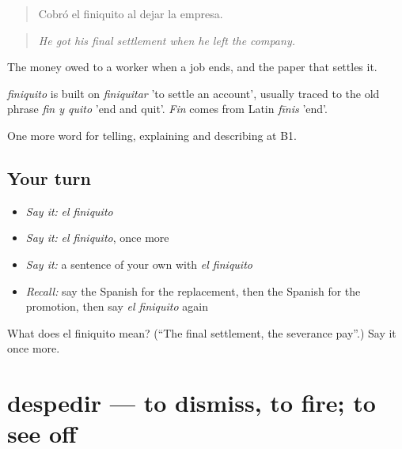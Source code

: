 \begin{quote}
Cobró el finiquito al dejar la empresa.
\end{quote}

\begin{quote}
\emph{He got his final settlement when he left the company.}
\end{quote}

The money owed to a worker when a job ends, and the paper that settles it.

\begin{cousinweb}
\emph{finiquito} is built on \emph{finiquitar} 'to settle an account', usually traced to the old phrase \emph{fin y quito} 'end and quit'. \emph{Fin} comes from Latin \emph{fīnis} 'end'.
\end{cousinweb}

\begin{grammarlens}[title={What you've built}]
One more word for telling, explaining and describing at B1.
\end{grammarlens}

\subsection*{Your turn}
\begin{itemize}
\raggedright
  \item \emph{Say it:} \emph{el finiquito}
  \item \emph{Say it:} \emph{el finiquito}, once more
  \item \emph{Say it:} a sentence of your own with \emph{el finiquito}
  \item \emph{Recall:} say the Spanish for the replacement, then the Spanish for the promotion, then say \emph{el finiquito} again
\end{itemize}

\begin{tcolorbox}[breakable,colback=teal!4,colframe=teal!35!black,title={Before you move on}]
What does el finiquito mean? (\textquotedblleft{}The final settlement, the severance pay\textquotedblright{}.) Say it once more.
\end{tcolorbox}
\section[despedir]{despedir — to dismiss, to fire; to see off}

\label{lesson:ES-C553-despedir}




